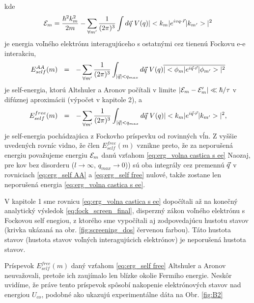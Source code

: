 kde
\begin{equation}\label{eq:erg_volna castica s ee}
\mathcal{E}_m = \frac{\hbar^2 k_m^2}{2m} - \sum_{\forall m'} \frac{1}{(2\pi)^{3}} \int d\vec{q}\ V(q) |<k_m|e^{ivq\cdot\vec{r}}|k_{m'}>|^2  \text{}
\end{equation}
je energia voľného elektrónu interagujúceho s ostatnými cez tienenú Fockovu e-e interakciu,
\begin{equation}\label{eq:erg_self AA}
 E_{self}^{AA}(m) \ \ = \ \  -\sum_{\forall m'} \frac{1}{(2\pi)^{3}} \int_{|\vec{q}| < q_{max}} d\vec{q}\ V(q) \overline{|<\phi_m|e^{i\vec{q}\cdot\vec{r}}|\phi_{m'}>|^2} \\
    \text{}
\end{equation}
je self-energia, ktorú Altshuler a Aronov počítali v limite $|\mathcal{E}_m - \mathcal{E}_m'|\ll \hbar/ \tau $ v difúznej aproximácii (výpočet v kapitole 2),
a
\begin{equation}\label{eq:erg_self free}
 E_{self}^{free}(m) \ \ =  \ \  - \sum_{\forall m'} \frac{1}{(2\pi)^{3}} \int_{|\vec{q}| < q_{max}} d\vec{q}\ V(q) |<k_m|e^{i\vec{q}\cdot\vec{r}}|k_{m'}>|^2\text{,}
\end{equation}
je self-energia pochádzajúca z Fockovho príspevku od rovinných vĺn. Z vyššie uvedených rovníc vidno, že  člen $E_{self}^{free}(m)$ vznikne preto, že za neporušená energiu považujeme
energiu $\mathcal{E}_m$ danú vzťahom \eqref{eq:erg_volna castica s ee}
Naozaj, pre kov bez disorderu ($l \rightarrow \infty$, $q_{max} \rightarrow 0$)) sú oba integrály cez premennú $\vec{q}$ v rovniciach \eqref{eq:erg_self AA} a \eqref{eq:erg_self free}
nulové, takže zostane len neporušená energia \eqref{eq:erg_volna castica s ee}.

V kapitole 1 sme rovnicu \eqref{eq:erg_volna castica s ee}
dopočítali až na konečný analytický výsledok \eqref{eq:fock_screen_final}, disperzný zákon voľného elektrónu s Fockovou self enegiou,
z ktorého sme vypočítali aj zodpovedajúcu hustotu stavov (krivka ukázaná na obr. \ref{fig:screening_dos} červenou farbou).
Táto hustota stavov (hustota stavov voľných interagujúcich elektrónov) je neporušená hustota stavov.

Príspevok $E_{self}^{free}(m)$ daný vzťahom \eqref{eq:erg_self free} Altshuler a Aronov neuvažovali, pretože ich zaujímalo len blízke okolie Fermiho energie.
Neskôr uvidíme, že práve tento príspevok spôsobí nakopenie elektrónových stavov nad energiou $U_{co}$, podobné ako ukazujú experimentálne dáta na Obr.  \ref{fig:B2}

